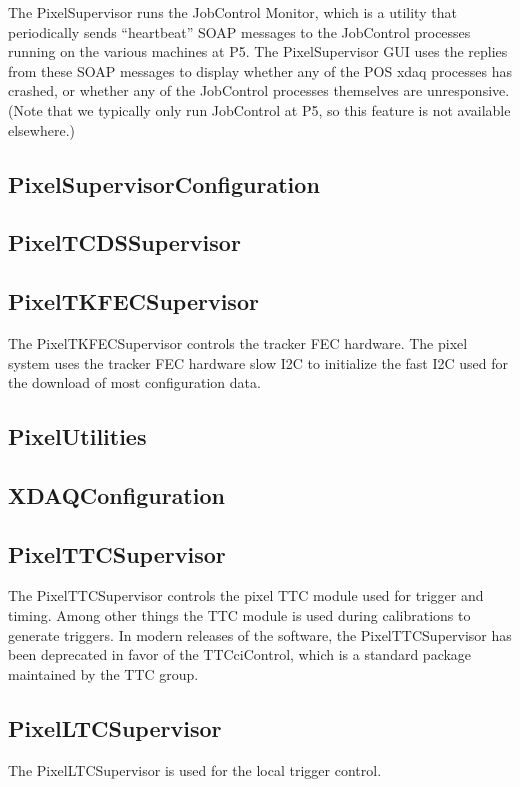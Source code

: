 The PixelSupervisor runs the JobControl Monitor, which is a utility
that periodically sends ``heartbeat'' SOAP messages to the JobControl
processes running on the various machines at P5. The PixelSupervisor
GUI uses the replies from these SOAP messages to display whether any of
the POS xdaq processes has crashed, or whether any of the JobControl
processes themselves are unresponsive. (Note that we typically only
run JobControl at P5, so this feature is not available elsewhere.)

\subsection{PixelSupervisorConfiguration}

\subsection{PixelTCDSSupervisor}

\subsection{PixelTKFECSupervisor}
The PixelTKFECSupervisor controls the tracker FEC hardware. The
pixel system uses the tracker FEC hardware slow I2C to
initialize the fast I2C used for the download of most 
configuration data.

\subsection{PixelUtilities}

\subsection{XDAQConfiguration}

\subsection{PixelTTCSupervisor}
The PixelTTCSupervisor controls the pixel TTC module used for trigger
and timing. Among other things the TTC module is used during
calibrations to generate triggers. In modern releases of the software,
the PixelTTCSupervisor has been deprecated in favor of the
TTCciControl, which is a standard package maintained by the TTC group.

\subsection{PixelLTCSupervisor}
The PixelLTCSupervisor is used for the local trigger control.


